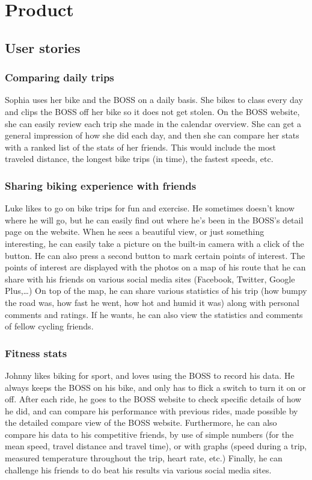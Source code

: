 \section{Product}
\subsection{User stories}
\subsubsection{Comparing daily trips}
Sophia uses her bike and the BOSS on a daily basis. 
She bikes to class every day and clips the BOSS off her bike so it does not get stolen. 
On the BOSS website, she can easily review each trip she made in the calendar overview. 
She can get a general impression of how she did each day, and then she can compare her stats with a ranked list of the stats of her friends. 
This would include the most traveled distance, the longest bike trips (in time), the fastest speeds, etc.

\subsubsection{Sharing biking experience with friends}
Luke likes to go on bike trips for fun and exercise. 
He sometimes doesn’t know where he will go, but he can easily find out where he’s been in the BOSS’s detail page on the website. 
When he sees a beautiful view, or just something interesting, he can easily take a picture on the built-in camera with a click of the button. 
He can also press a second button to mark certain points of interest. 
The points of interest are displayed with the photos on a map of his route that he can share with his friends on various social media sites (Facebook, Twitter, Google Plus,…) On top of the map, he can share various statistics of his trip (how bumpy the road was, how fast he went, how hot and humid it was) along with personal comments and ratings. 
If he wants, he can also view the statistics and comments of fellow cycling friends. 

\subsubsection{Fitness stats}
Johnny likes biking for sport, and loves using the BOSS to record his data. 
He always keeps the BOSS on his bike, and only has to flick a switch to turn it on or off. 
After each ride, he goes to the BOSS website to check specific details of how he did, and can compare his performance with previous rides, made possible by the detailed compare view of the BOSS website. 
Furthermore, he can also compare his data to his competitive friends, by use of simple numbers (for the mean speed, travel distance and travel time), or with graphs (speed during a trip, measured temperature throughout the trip, heart rate, etc.) Finally, he can challenge his friends to do beat his results via various social media sites.

